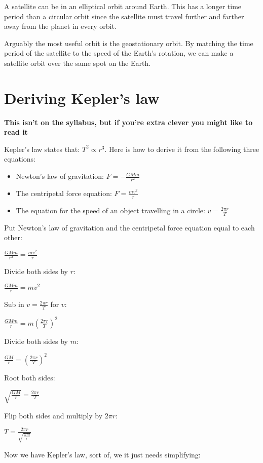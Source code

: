 \documentclass{article}
\begin{document}
A satellite can be in an elliptical orbit around Earth. This has a longer time
period than a circular orbit since the satellite must travel further and farther
away from the planet in every orbit.

Arguably the most useful orbit is the geostationary orbit. By matching the time
period of the satellite to the speed of the Earth's rotation, we can make a
satellite orbit over the same spot on the Earth.

\section*{Deriving Kepler's law}
\textbf{This isn't on the syllabus, but if you're extra clever you might like to
read it}

Kepler's law states that: $T^2 \propto r^3$. Here is how to derive it from the
following three equations:

\begin{itemize}

\item Newton's law of gravitation: $F = -\frac{GMm}{r^2}$

\item The centripetal force equation: $F = \frac{mv^2}{r}$

\item The equation for the speed of an object travelling in a circle: 
$v = \frac{2 \pi r}{T}$

\end{itemize}


Put Newton's law of gravitation and the centripetal force equation equal to each
other:

$\frac{GMm}{r^2} = \frac{mv^2}{r}$

Divide both sides by $r$:

$\frac{GMm}{r} = mv^2$

Sub in $v = \frac{2 \pi r}{T}$ for $v$:

$\frac{GMm}{r} = m(\frac{2 \pi r}{T})^2$

Divide both sides by $m$:

$\frac{GM}{r} = (\frac{2 \pi r}{T})^2$

Root both sides:

$\sqrt{\frac{GM}{r}} = \frac{2 \pi r}{T}$

Flip both sides and multiply by $2 \pi r$:

$T = \frac{2 \pi r}{\sqrt{\frac{GM}{r}}}$

Now we have Kepler's law, sort of, we it just needs simplifying:
\end{document}
